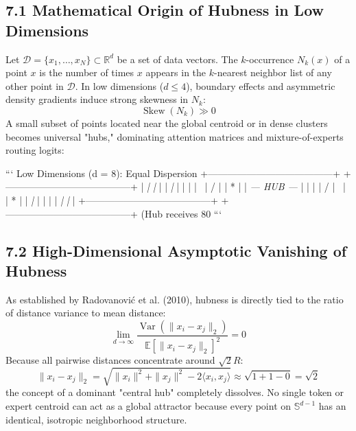 \documentclass[11pt,twoside,openright]{amsbook}
\begin{document}
\subsection{7.1 Mathematical Origin of Hubness in Low Dimensions}

Let $\mathcal{D} = \{x_1, \dots, x_N\} \subset \mathbb{R}^d$ be a set of data vectors. The $k$-occurrence $N_k(x)$ of a point $x$ is the number of times $x$ appears in the $k$-nearest neighbor list of any other point in $\mathcal{D}$.
In low dimensions ($d \le 4$), boundary effects and asymmetric density gradients induce strong skewness in $N_k$:
$$\operatorname{Skew}(N_k) \gg 0$$
A small subset of points located near the global centroid or in dense clusters becomes universal "hubs," dominating attention matrices and mixture-of-experts routing logits:

```
Low Dimensions (d = 8): Equal Dispersion
+---------------------------------------+    +---------------------------------------+
|                 \textit{                     |    |       }           \textit{           }       |
|             \textit{   |   }                 |    |                                       |
|               \ | /                   |    |   \textit{           }           *           |
|          \textit{ --- HUB --- }              |    |                                       |
|               / | \                   |    |       \textit{           }           *       |
|             \textit{   |   }                 |    |                                       |
|                 \textit{                     |    |   }           \textit{           }           |
+---------------------------------------+    +---------------------------------------+
(Hub receives 80%
```

\subsection{7.2 High-Dimensional Asymptotic Vanishing of Hubness}

As established by Radovanović et al. (2010), hubness is directly tied to the ratio of distance variance to mean distance:
$$\lim_{d \to \infty} \frac{\operatorname{Var}(\|x_i - x_j\|_2)}{\mathbb{E}[\|x_i - x_j\|_2]^2} = 0$$
Because all pairwise distances concentrate around $\sqrt{2} R$:
$$\|x_i - x_j\|_2 = \sqrt{\|x_i\|^2 + \|x_j\|^2 - 2\langle x_i, x_j \rangle} \approx \sqrt{1 + 1 - 0} = \sqrt{2}$$
the concept of a dominant "central hub" completely dissolves. No single token or expert centroid can act as a global attractor because every point on $\mathbb{S}^{d-1}$ has an identical, isotropic neighborhood structure.
\end{document}

